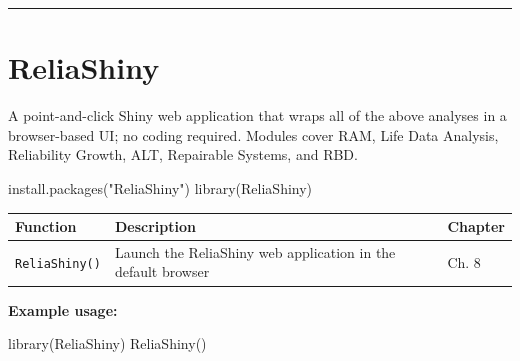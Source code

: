 \documentclass[
  letterpaper,
  DIV=11,
  numbers=noendperiod]{scrreprt}
\newenvironment{Shaded}{\begin{snugshade}}{\end{snugshade}}
\newcommand{\FunctionTok}[1]{\textcolor[rgb]{0.28,0.35,0.67}{#1}}
\newcommand{\NormalTok}[1]{\textcolor[rgb]{0.00,0.23,0.31}{#1}}
\newcommand{\StringTok}[1]{\textcolor[rgb]{0.13,0.47,0.30}{#1}}
\newcounter{none} %
\begin{document}
\begin{center}\rule{0.5\linewidth}{0.5pt}\end{center}

\section*{ReliaShiny}\label{reliashiny}


A point-and-click Shiny web application that wraps all of the above
analyses in a browser-based UI; no coding required. Modules cover RAM,
Life Data Analysis, Reliability Growth, ALT, Repairable Systems, and
RBD.

\begin{Shaded}
\begin{Highlighting}[]
\FunctionTok{install.packages}\NormalTok{(}\StringTok{"ReliaShiny"}\NormalTok{)}
\FunctionTok{library}\NormalTok{(ReliaShiny)}
\end{Highlighting}
\end{Shaded}

{\def\LTcaptype{none} %
\begin{longtable}[]{@{}
  >{\raggedright\arraybackslash}p{}
  >{\raggedright\arraybackslash}p{}
  >{\raggedright\arraybackslash}p{}@{}}
\toprule\noalign{}
\begin{minipage}[b]{\linewidth}\raggedright
Function
\end{minipage} & \begin{minipage}[b]{\linewidth}\raggedright
Description
\end{minipage} & \begin{minipage}[b]{\linewidth}\raggedright
Chapter
\end{minipage} \\
\midrule\noalign{}
\endhead
\bottomrule\noalign{}
\endlastfoot
\texttt{ReliaShiny()} & Launch the ReliaShiny web application in the
default browser & Ch. 8 \\
\end{longtable}
}

\textbf{Example usage:}

\begin{Shaded}
\begin{Highlighting}[]
\FunctionTok{library}\NormalTok{(ReliaShiny)}
\FunctionTok{ReliaShiny}\NormalTok{()}
\end{Highlighting}
\end{Shaded}
\end{document}
